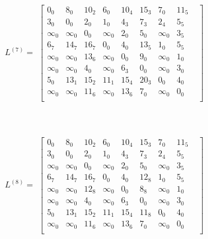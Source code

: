 \documentclass{article}
\begin{document}
$L^{(7)} = $
$\begin{bmatrix}
0_0 & 8_0 & 10_2 & 6_0 & 10_4 & 15_3 & 7_0 & 11_5 & \\
3_0 & 0_0 & 2_0 & 1_0 & 4_3 & 7_3 & 2_4 & 5_5 & \\
\infty_0 & \infty_0 & 0_0 & \infty_0 & 2_0 & 5_0 & \infty_0 & 3_5 & \\
6_7 & 14_7 & 16_7 & 0_0 & 4_0 & 13_5 & 1_0 & 5_5 & \\
\infty_0 & \infty_0 & 13_6 & \infty_0 & 0_0 & 9_0 & \infty_0 & 1_0 & \\
\infty_0 & \infty_0 & 4_0 & \infty_0 & 6_3 & 0_0 & \infty_0 & 3_0 & \\
5_0 & 13_1 & 15_2 & 11_1 & 15_4 & 20_3 & 0_0 & 4_0 & \\
\infty_0 & \infty_0 & 11_6 & \infty_0 & 13_6 & 7_0 & \infty_0 & 0_0 & \\
\end{bmatrix}$\\\\\\\\
$L^{(8)} = $
$\begin{bmatrix}
0_0 & 8_0 & 10_2 & 6_0 & 10_4 & 15_3 & 7_0 & 11_5 & \\
3_0 & 0_0 & 2_0 & 1_0 & 4_3 & 7_3 & 2_4 & 5_5 & \\
\infty_0 & \infty_0 & 0_0 & \infty_0 & 2_0 & 5_0 & \infty_0 & 3_5 & \\
6_7 & 14_7 & 16_7 & 0_0 & 4_0 & 12_8 & 1_0 & 5_5 & \\
\infty_0 & \infty_0 & 12_8 & \infty_0 & 0_0 & 8_8 & \infty_0 & 1_0 & \\
\infty_0 & \infty_0 & 4_0 & \infty_0 & 6_3 & 0_0 & \infty_0 & 3_0 & \\
5_0 & 13_1 & 15_2 & 11_1 & 15_4 & 11_8 & 0_0 & 4_0 & \\
\infty_0 & \infty_0 & 11_6 & \infty_0 & 13_6 & 7_0 & \infty_0 & 0_0 & \\
\end{bmatrix}$
\end{document}
